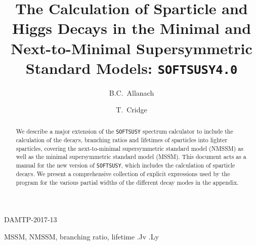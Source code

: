 \documentclass[final,3p,times]{elsarticle}
\begin{document}
\begin{frontmatter}

\begin{flushright}
DAMTP-2017-13\\
\end{flushright}

\title{The Calculation of Sparticle and Higgs Decays in the Minimal and Next-to-Minimal Supersymmetric Standard Models: {\tt SOFTSUSY4.0}}

\author[damtp]{B.C.~Allanach}
\author[damtp]{T.~Cridge}
\address[damtp]{DAMTP, CMS, University of Cambridge, Wilberforce road,
  Cambridge, CB3  0WA, United Kingdom}
\begin{abstract}
We describe a major extension of the {\tt SOFTSUSY} spectrum calculator to
include 
the calculation of the decays, branching ratios and lifetimes of sparticles
into lighter 
sparticles, covering  the next-to-minimal supersymmetric standard model
(NMSSM) as 
well as the minimal supersymmetric standard model (MSSM).
This document
acts as a manual for the
new version of {\tt SOFTSUSY}, which includes the calculation of sparticle
decays. We present a comprehensive collection of explicit expressions used by
the program for the various partial widths of the different decay modes in the
appendix.  
\end{abstract}

\begin{keyword}
MSSM, NMSSM, branching ratio, lifetime
.Jv
.Ly
\end{keyword}
\end{frontmatter}
\end{document}

